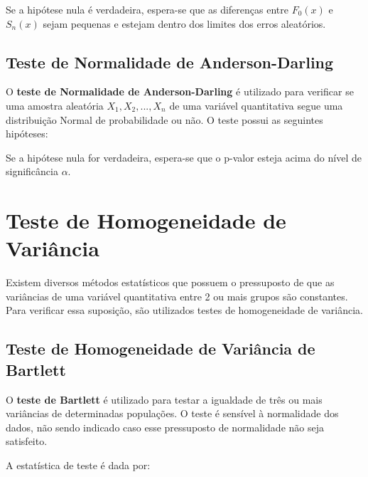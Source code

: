 \documentclass[
]{estat/estat}
\begin{document}
Se a hipótese nula é verdadeira, espera-se que as diferenças entre
\(F_0(x)\) e \(S_n(x)\) sejam pequenas e estejam dentro dos limites dos
erros aleatórios.

\hypertarget{teste-de-normalidade-de-anderson-darling}{%
\subsection{Teste de Normalidade de
Anderson-Darling}\label{teste-de-normalidade-de-anderson-darling}}

O \textbf{teste de Normalidade de Anderson-Darling} é utilizado para
verificar se uma amostra aleatória \(X_1, X_2, ..., X_n\) de uma
variável quantitativa segue uma distribuição Normal de probabilidade ou
não. O teste possui as seguintes hipóteses:

\begin{center}
\end{center}

Se a hipótese nula for verdadeira, espera-se que o p-valor esteja acima
do nível de significância \(\alpha\).

\hypertarget{teste-de-homogeneidade-de-variuxe2ncia}{%
\section{Teste de Homogeneidade de
Variância}\label{teste-de-homogeneidade-de-variuxe2ncia}}

Existem diversos métodos estatísticos que possuem o pressuposto de que
as variâncias de uma variável quantitativa entre 2 ou mais grupos são
constantes. Para verificar essa suposição, são utilizados testes de
homogeneidade de variância.

\hypertarget{teste-de-homogeneidade-de-variuxe2ncia-de-bartlett}{%
\subsection{Teste de Homogeneidade de Variância de
Bartlett}\label{teste-de-homogeneidade-de-variuxe2ncia-de-bartlett}}

O \textbf{teste de Bartlett} é utilizado para testar a igualdade de três
ou mais variâncias de determinadas populações. O teste é sensível à
normalidade dos dados, não sendo indicado caso esse pressuposto de
normalidade não seja satisfeito.

A estatística de teste é dada por:
\end{document}
